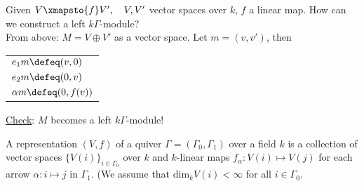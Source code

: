 \noindent Given \(V\xmapsto{f}V',\quad V,V'\) vector spaces over \(k\), \(f\) a linear map. How can we construct a left \(k\Gamma\)-module?\\
From above: \(M = V\oplus V'\) as a vector space. Let \(m = (v, v')\), then\\
\begin{center}
\begin{tabular}{l}
\(e_1m \defeq (v, 0)\)\\
\(e_2m \defeq (0, v)\)\\
\(\alpha m \defeq (0, f(v))\)
\end{tabular}
\end{center}
\underline{Check}: \(M\) becomes a left \(k\Gamma\)-module!
\begin{defin}
A representation \((V, f)\) of a quiver \(\Gamma = (\Gamma_0, \Gamma_1)\) over a field \(k\) is a collection of vector spaces \(\{V(i)\}_{i\in\Gamma_0}\) over \(k\) and \(k\)-linear maps \(f_\alpha:V(i)\mapsto V(j)\) for each arrow \(\alpha: i\mapsto j\) in \(\Gamma_1\). (We assume that \(\text{dim}_kV(i) < \infty\) for all \(i\in\Gamma_0\).
\end{defin}
